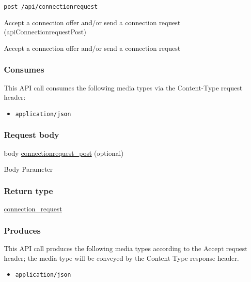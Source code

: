 \begin{verbatim}
post /api/connectionrequest
\end{verbatim}

Accept a connection offer and/or send a connection request
({apiConnectionrequestPost})

Accept a connection offer and/or send a connection request

\hypertarget{consumes-50}{%
\subsubsection{Consumes}\label{consumes-50}}

This API call consumes the following media types via the {Content-Type}
request header:

\begin{itemize}
\tightlist
\item
  \texttt{application/json}
\end{itemize}

\hypertarget{request-body-50}{%
\subsubsection{Request body}\label{request-body-50}}

body \protect\hyperlink{connectionrequest_post}{connectionrequest\_post}
(optional)

{Body Parameter} ---

\hypertarget{return-type-123}{%
\subsubsection{Return type}\label{return-type-123}}

\protect\hyperlink{connection_request}{connection\_request}

\hypertarget{produces-157}{%
\subsubsection{Produces}\label{produces-157}}

This API call produces the following media types according to the
{Accept} request header; the media type will be conveyed by the
{Content-Type} response header.

\begin{itemize}
\tightlist
\item
  \texttt{application/json}
\end{itemize}

